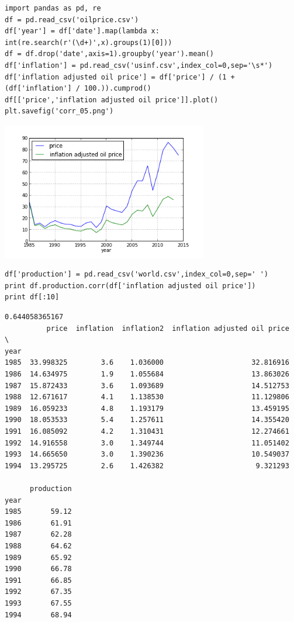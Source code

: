 \documentclass[12pt,fleqn]{article}\usepackage{../common}
\begin{document}
\begin{verbatim}
import pandas as pd, re
df = pd.read_csv('oilprice.csv')
df['year'] = df['date'].map(lambda x: int(re.search(r'(\d+)',x).groups(1)[0]))
df = df.drop('date',axis=1).groupby('year').mean()
df['inflation'] = pd.read_csv('usinf.csv',index_col=0,sep='\s*')
df['inflation adjusted oil price'] = df['price'] / (1 + (df['inflation'] / 100.)).cumprod()
df[['price','inflation adjusted oil price']].plot()
plt.savefig('corr_05.png')
\end{verbatim}

\includegraphics[height=6cm]{corr_05.png}

\begin{verbatim}
df['production'] = pd.read_csv('world.csv',index_col=0,sep=' ')
print df.production.corr(df['inflation adjusted oil price'])
print df[:10]
\end{verbatim}

\begin{verbatim}
0.644058365167
          price  inflation  inflation2  inflation adjusted oil price  \
year                                                                   
1985  33.998325        3.6    1.036000                     32.816916   
1986  14.634975        1.9    1.055684                     13.863026   
1987  15.872433        3.6    1.093689                     14.512753   
1988  12.671617        4.1    1.138530                     11.129806   
1989  16.059233        4.8    1.193179                     13.459195   
1990  18.053533        5.4    1.257611                     14.355420   
1991  16.085092        4.2    1.310431                     12.274661   
1992  14.916558        3.0    1.349744                     11.051402   
1993  14.665650        3.0    1.390236                     10.549037   
1994  13.295725        2.6    1.426382                      9.321293   

      production  
year              
1985       59.12  
1986       61.91  
1987       62.28  
1988       64.62  
1989       65.92  
1990       66.78  
1991       66.85  
1992       67.35  
1993       67.55  
1994       68.94  
\end{verbatim}
\end{document}
